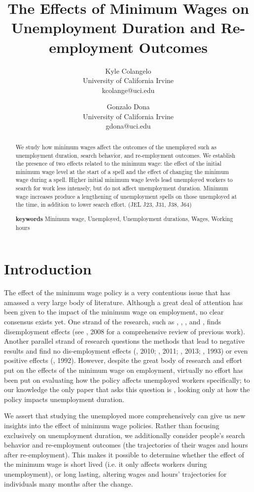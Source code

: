 \documentclass{article}
\title{The Effects of Minimum Wages on Unemployment Duration and Re-employment Outcomes}
\author{Kyle Colangelo\\University of California Irvine\\kcolange@uci.edu
		\and
		Gonzalo Dona\\University of California Irvine\\gdona@uci.edu}
\begin{document}
\maketitle
\begin{abstract}
	We study how minimum wages affect the outcomes of the unemployed such as unemployment duration, search behavior, and re-employment outcomes. We establish the presence of two effects related to the minimum wage: the effect of the initial minimum wage level at the start of a spell and the effect of changing the minimum wage during a spell. Higher initial minimum wage levels lead unemployed workers to search for work less intensely, but do not affect unemployment duration. Minimum wage increases produce a lengthening of unemployment spells on those unemployed at the time, in addition to lower search effort. (JEL J23, J31, J38, J64)
	
	\textbf{keywords} Minimum wage, Unemployed, Unemployment durations, Wages, Working hours
\end{abstract}

\newpage
\section{Introduction}

The effect of the minimum wage policy is a very contentious issue that has amassed a very large body of literature. Although a great deal of attention has been given to the impact of the minimum wage on employment, no clear consensus exists yet. One strand of the research, such as \cite{powell2017synthetic}, \cite{meer2016effects}, \cite{thompson2009using}, and \cite{neumark2004minimum}, finds disemployment effects (see \citeauthor{neumark2008minimum}, 2008 for a comprehensive review of previous work). Another parallel strand of research questions the methods that lead to negative results and find no dis-employment effects (\citeauthor{dube2010minimum}, 2010; \citeauthor{allegretto2011minimum}, 2011; \citeauthor{giuliano2013minimum}, 2013; \citeauthor{card1993minimum}, 1993) or even positive effects (\citeauthor{card1992minimum}, 1992). However, despite the great body of research and effort put on the effects of the minimum wage on employment, virtually no effort has been put on evaluating how the policy affects unemployed workers specifically; to our knowledge the only paper that asks this question is \cite{pedace2011impact}, looking only at how the policy impacts unemployment duration.

We assert that studying the unemployed more comprehensively can give us new insights into the effect of minimum wage policies. Rather than focusing exclusively on unemployment duration, we additionally consider people's search behavior and re-employment outcomes (the trajectories of their wages and hours after re-employment). This makes it possible to determine whether the effect of the minimum wage is short lived (i.e. it only affects workers during unemployment), or long lasting, altering wages and hours' trajectories for individuals many months after the change.
\end{document}
